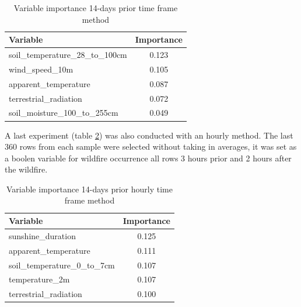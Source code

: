 \begin{table}[H]
	\centering
	\caption{Variable importance 14-days prior time frame method}
	\begin{tabular}{lc}
		\hline
		Variable                         & \multicolumn{1}{l}{Importance} \\ \hline
		soil\_temperature\_28\_to\_100cm & 0.123                          \\
		wind\_speed\_10m                 & 0.105                          \\
		apparent\_temperature            & 0.087                          \\
		terrestrial\_radiation           & 0.072                          \\
		soil\_moisture\_100\_to\_255cm   & 0.049                         
	\end{tabular}
	\label{14_days_prior_importance}
\end{table}

A last experiment (table \ref{14_days_prior_hourly_importance}) was also conducted with an hourly method. The last 360 rows from each sample were selected without taking in averages, it was set as a boolen variable for wildfire occurrence all rows 3 hours prior and 2 hours after the wildfire. 

\begin{table}[H]
	\centering
	\caption{Variable importance 14-days prior hourly time frame method}
	\begin{tabular}{lc}
		\hline
		Variable                         & \multicolumn{1}{l}{Importance} \\ \hline
		sunshine\_duration & 0.125                          \\
		apparent\_temperature                 & 0.111                          \\
		soil\_temperature\_0\_to\_7cm            & 0.107                          \\
		temperature\_2m           & 0.107                          \\
		terrestrial\_radiation   & 0.100                         
	\end{tabular}
	\label{14_days_prior_hourly_importance}
\end{table}


